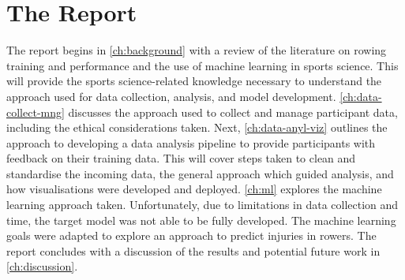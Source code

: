 \section{The Report}
The report begins in \autoref{ch:background} with a review of the literature on rowing training and performance and the use of machine learning in sports science. This will provide the sports science-related knowledge necessary to understand the approach used for data collection, analysis, and model development. \autoref{ch:data-collect-mng} discusses the approach used to collect and manage participant data, including the ethical considerations taken. Next, \autoref{ch:data-anyl-viz} outlines the approach to developing a data analysis pipeline to provide participants with feedback on their training data. This will cover steps taken to clean and standardise the incoming data, the general approach which guided analysis, and how visualisations were developed and deployed. \autoref{ch:ml} explores the machine learning approach taken. Unfortunately, due to limitations in data collection and time, the target model was not able to be fully developed. The machine learning goals were adapted to explore an approach to predict injuries in rowers. The report concludes with a discussion of the results and potential future work in \autoref{ch:discussion}.
